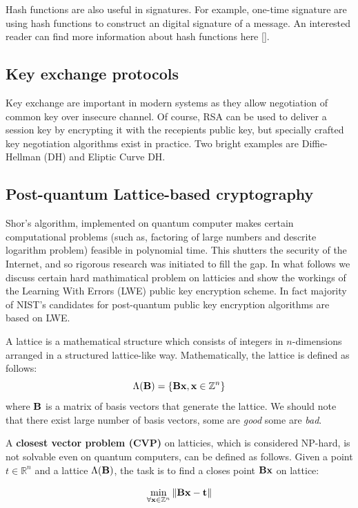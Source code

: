 Hash functions are also useful in signatures. For example, one-time signature are using 
hash functions to construct an digital signature of a message. An interested reader can 
find more information about hash functions here [].

\subsection{Key exchange protocols}

Key exchange are important in modern systems as they allow negotiation of common 
key over insecure channel. Of course, RSA can be used to deliver a session key
by encrypting it with the recepients public key, but specially crafted key negotiation
algorithms exist in practice. Two bright examples are Diffie-Hellman (DH) and Eliptic Curve 
DH. 


\subsection{Post-quantum Lattice-based cryptography}

Shor's algorithm, implemented on quantum computer makes certain computational 
problems (such as, factoring of large numbers and descrite logarithm problem) 
feasible in polynomial time. This shutters the security of the Internet, and 
so rigorous research was initiated to fill the gap. In what follows we discuss
certain hard mathimatical problem on latticies and show the workings of the 
Learning With Errors (LWE) public key encryption scheme. In fact majority of 
NIST's candidates for post-quantum public key encryption algorithms are based 
on LWE.

A lattice is a mathematical structure which consists of integers in $n$-dimensions 
arranged in a structured lattice-like way. Mathematically, the lattice is defined as follows:
$$\Lambda({\bf B}) = \{{\bf Bx}, {\bf x} \in \mathbb{Z}^n \}$$ where ${\bf B}$ is a matrix of basis vectors
that generate the lattice. We should note that there exist large number of basis vectors, some are {\it good}
some are {\it bad}.

A { \bf closest vector problem (CVP) } on latticies, which is considered NP-hard, is not solvable even on 
quantum computers, can be defined as follows. Given a point $t \in \mathbb{R}^n$ and a lattice
$\Lambda({\bf B})$, the task is to find a closes point ${\bf Bx}$ on lattice: 

$$\min_{\forall {\bf x} \in \mathbb{Z}^n} \|{\bf Bx} - {\bf t}\|$$ 

